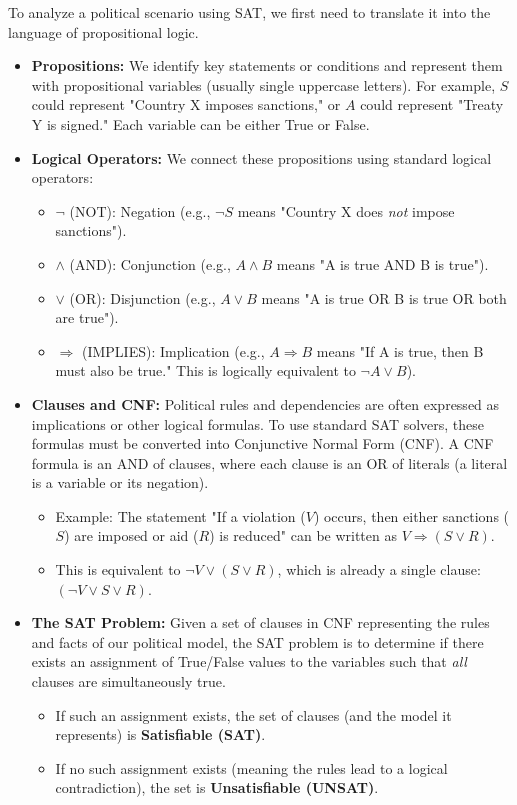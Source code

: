 \documentclass[11pt, a4paper]{article}
\begin{document}
To analyze a political scenario using SAT, we first need to translate it into the language of propositional logic.
\begin{itemize}
    \item \textbf{Propositions:} We identify key statements or conditions and represent them with propositional variables (usually single uppercase letters). For example, $S$ could represent "Country X imposes sanctions," or $A$ could represent "Treaty Y is signed." Each variable can be either True or False.
    \item \textbf{Logical Operators:} We connect these propositions using standard logical operators:
    \begin{itemize}
        \item $\neg$ (NOT): Negation (e.g., $\neg S$ means "Country X does \textit{not} impose sanctions").
        \item $\wedge$ (AND): Conjunction (e.g., $A \wedge B$ means "A is true AND B is true").
        \item $\vee$ (OR): Disjunction (e.g., $A \vee B$ means "A is true OR B is true OR both are true").
        \item $\Rightarrow$ (IMPLIES): Implication (e.g., $A \Rightarrow B$ means "If A is true, then B must also be true." This is logically equivalent to $\neg A \vee B$).
    \end{itemize}
    \item \textbf{Clauses and CNF:} Political rules and dependencies are often expressed as implications or other logical formulas. To use standard SAT solvers, these formulas must be converted into Conjunctive Normal Form (CNF). A CNF formula is an AND of clauses, where each clause is an OR of literals (a literal is a variable or its negation).
    \begin{itemize}
            \item Example: The statement "If a violation ($V$) occurs, then either sanctions ($S$) are imposed or aid ($R$) is reduced" can be written as $V \Rightarrow (S \vee R)$.
            \item This is equivalent to $\neg V \vee (S \vee R)$, which is already a single clause: $(\neg V \vee S \vee R)$.
    \end{itemize}
    \item \textbf{The SAT Problem:} Given a set of clauses in CNF representing the rules and facts of our political model, the SAT problem is to determine if there exists an assignment of True/False values to the variables such that \textit{all} clauses are simultaneously true.
    \begin{itemize}
        \item If such an assignment exists, the set of clauses (and the model it represents) is \textbf{Satisfiable (SAT)}.
        \item If no such assignment exists (meaning the rules lead to a logical contradiction), the set is \textbf{Unsatisfiable (UNSAT)}.
    \end{itemize}
\end{itemize}
\end{document}
